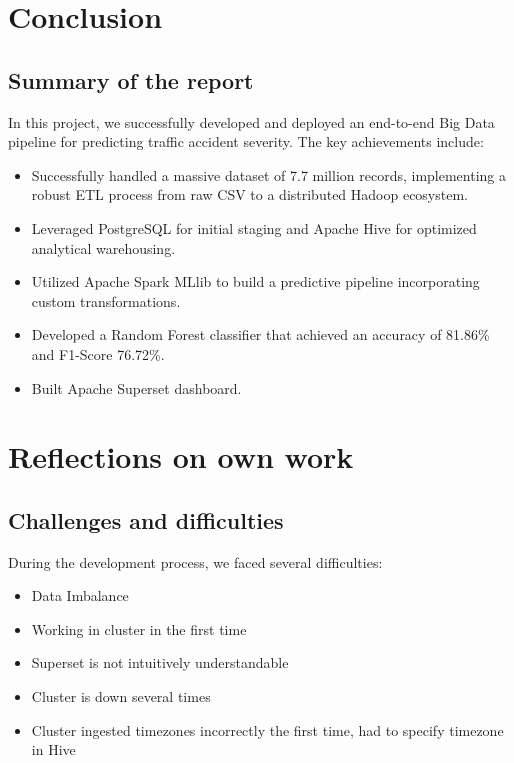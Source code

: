 \documentclass[11pt,a4paper]{article}
\begin{document}
\section{Conclusion}
\subsection*{Summary of the report}
In this project, we successfully developed and deployed an end-to-end Big Data pipeline for predicting traffic accident severity. The key achievements include:
\begin{itemize}
    \item Successfully handled a massive dataset of 7.7 million records, implementing a robust ETL process from raw CSV to a distributed Hadoop ecosystem.
    \item Leveraged PostgreSQL for initial staging and Apache Hive for optimized analytical warehousing.
    \item Utilized Apache Spark MLlib to build a predictive pipeline incorporating custom transformations.
    \item Developed a Random Forest classifier that achieved an accuracy of 81.86\% and F1-Score 76.72\%.
    \item Built Apache Superset dashboard.
\end{itemize}

\section{Reflections on own work}
\subsection*{Challenges and difficulties}
During the development process, we faced several difficulties:
\begin{itemize}
    \item Data Imbalance
    \item Working in cluster in the first time
    \item Superset is not intuitively understandable
    \item Cluster is down several times
    \item Cluster ingested timezones incorrectly the first time, had to specify timezone in Hive
\end{itemize}
\end{document}
